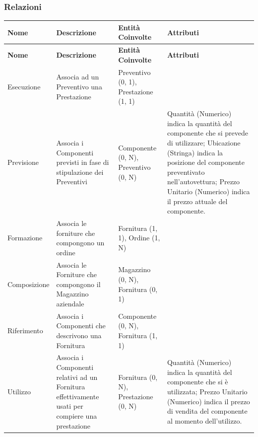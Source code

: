 		\subsubsection{Relazioni}
		\label{sec:relationships}
			{\small
			\begin{longtable}{| p{2cm} | p{4cm} | p{3cm} | p{3cm} |}
				
				\hline
				\textbf{Nome} & 
				\textbf{Descrizione} & 
				\textbf{Entità Coinvolte} & 
				\textbf{Attributi} \\ 
				\hline
				
				\endfirsthead
				
				\hline
				\textbf{Nome} & 
				\textbf{Descrizione} & 
				\textbf{Entità Coinvolte} & 
				\textbf{Attributi} \\ 
				\hline
				
				\endhead
				
				Esecuzione &
				Associa ad un Preventivo una Prestazione &
				Preventivo (0, 1), Prestazione (1, 1) &

				\\ \hline

				Previsione &
				Associa i Componenti previsti in fase di stipulazione dei Preventivi &
				Componente (0, N), Preventivo (0, N) &
				Quantità (Numerico) indica la quantità del componente che si prevede di utilizzare; Ubicazione (Stringa) indica la posizione del componente preventivato nell'autovettura; Prezzo Unitario (Numerico) indica il prezzo attuale del componente.
				\\ \hline

				Formazione &
				Associa le forniture che compongono un ordine &
				Fornitura (1, 1), Ordine (1, N) &

				\\ \hline

				Composizione &
				Associa le Forniture che compongono il Magazzino aziendale &
				Magazzino (0, N), Fornitura (0, 1) &

				\\ \hline

				Riferimento &
				Associa i Componenti che descrivono una Fornitura &
				Componente (0, N), Fornitura (1, 1) &

				\\ \hline

				Utilizzo &
				Associa i Componenti relativi ad un Fornitura effettivamente usati per compiere una prestazione &
				Fornitura (0, N), Prestazione (0, N) &
				Quantità (Numerico) indica la quantità del componente che si è utilizzata; Prezzo Unitario (Numerico) indica il prezzo di vendita del componente al momento dell'utilizzo.
				\\ \hline


\end{longtable}}
